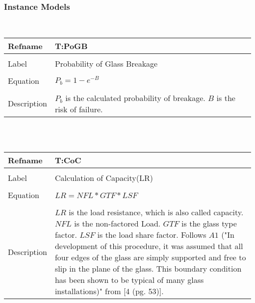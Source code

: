 \documentclass[12pt]{article}
\begin{document}
\subsubsection{Instance Models}
\label{Sec:IM}
~\newline
\noindent \begin{minipage}{\textwidth}
\begin{tabular}{p{} p{}}
\toprule \textbf{Refname} & \textbf{T:PoGB}
\label{T:PoGB}
\\ \midrule \\
Label & Probability of Glass Breakage
\\ \midrule \\
Equation & $P_{b}=1-e^{-B}$
\\ \midrule \\
Description & $P_{b}$ is the calculated probability of breakage. $B$ is the risk of failure.
\\ \bottomrule \end{tabular}
\end{minipage}\\
~\newline
\noindent \begin{minipage}{\textwidth}
\begin{tabular}{p{} p{}}
\toprule \textbf{Refname} & \textbf{T:CoC}
\label{T:CoC}
\\ \midrule \\
Label & Calculation of Capacity(LR)
\\ \midrule \\
Equation & $LR=NFL*GTF*LSF$
\\ \midrule \\
Description & $LR$ is the load resistance, which is also called capacity. $NFL$ is the non-factored Load. $GTF$ is the glass type factor. $LSF$ is the load share factor. Follows $A1$ ("In development of this procedure, it was assumed that all four edges of the glass are simply supported and free to slip in the plane of the glass. This boundary condition has been shown to be typical of many glass installations)" from [4 (pg. 53)].
\\ \bottomrule \end{tabular}
\end{minipage}\\
~\newline
\end{document}
